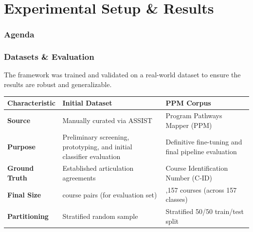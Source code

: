 \documentclass[aspectratio=169,10pt]{beamer}
\begin{document}
\begin{frame}
    
\end{frame}

\section{Experimental Setup \& Results}
\begin{frame}
    \frametitle{Agenda}
    \tableofcontents[currentsection]
\end{frame}

\begin{frame}
    \frametitle{Datasets \& Evaluation}
    
    The framework was trained and validated on a real-world dataset to ensure the results are robust and generalizable.
    
    \vspace{2em}
    \centering
    \begin{tabularx}{0.95\textwidth}{>{\raggedright\arraybackslash}p{2.2cm} >{\raggedright\arraybackslash}X >{\raggedright\arraybackslash}X}
        \toprule
        \textbf{Characteristic} & \textbf{Initial Dataset}                                      
        & \textbf{PPM Corpus}                                  \\
        \midrule
        \textbf{Source}         & Manually curated via ASSIST                   
        & Program Pathways Mapper (PPM)                        \\
        \addlinespace
        \textbf{Purpose}        & Preliminary screening, prototyping, and initial classifier evaluation & Definitive fine-tuning and final pipeline evaluation \\
        \addlinespace
        \textbf{Ground Truth}   & Established articulation agreements                                   & Course Identification Number (C-ID)                  \\
        \addlinespace
        \textbf{Final Size}     & 400 course pairs (for evaluation set)                                 & 2,157 courses (across 157 classes)                   \\
        \addlinespace
        \textbf{Partitioning}   & Stratified random sample                                              & Stratified 50/50 train/test split                    \\
        \bottomrule
    \end{tabularx}

\end{frame}
\end{document}
